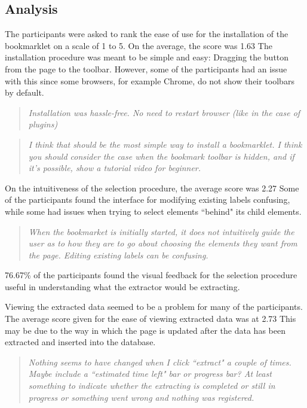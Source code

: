 \subsection{Analysis}
The participants were asked to rank the ease of use for the installation of the bookmarklet on
a scale of 1 to 5. On the average, the score was 1.63 The installation procedure was meant to
be simple and easy: Dragging the button from the page to the toolbar. However, some of the 
participants had an issue with this since some browsers, for example Chrome, do not show their
toolbars by default. 
\begin{quote}
\textit{Installation was hassle-free. No need to restart browser (like in the case of plugins)}
\end{quote}
\begin{quote}
\textit{
I think that should be the most simple way to install a bookmarklet. 
I think you should consider the case when the bookmark toolbar is hidden,
and if it's possible, show a tutorial video for beginner.}
\end{quote}

On the intuitiveness of the selection procedure, the average score was 2.27
Some of the participants found the interface for modifying existing labels confusing,
while some had issues when trying to select elements ``behind" its child elements.
\begin{quote}
\textit{
When the bookmarket is initially started, it does not intuitively guide the user as
to how they are to go about choosing the elements they want from the page. Editing existing
labels can be confusing.}
\end{quote}
76.67\% of the participants found the visual feedback for the selection procedure useful
in understanding what the extractor would be extracting. 

Viewing the extracted data seemed to be a problem for many of the participants. The average
score given for the ease of viewing extracted data was at 2.73 This may be due to the way
in which the page is updated after the data has been extracted and inserted into the database.

\begin{quote}
\textit{
Nothing seems to have changed when I click ``extract" a couple of times. 
Maybe include a ``estimated time left" bar or progress bar?
At least something to indicate whether the extracting is completed or
still in progress or something went wrong and nothing was registered.}
\end{quote}

